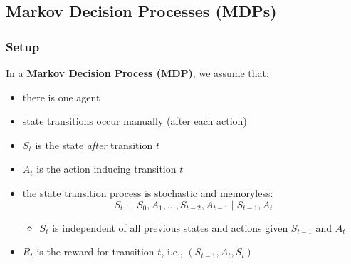 \subsection{Markov Decision Processes (MDPs)}
\subsubsection{Setup}
\begin{summary}
    In a \textbf{Markov Decision Process (MDP)}, we assume that:
    \begin{itemize}
        \item there is one agent
        \item state transitions occur manually (after each action)
        \item $S_t$ is the state \textit{after} transition $t$
        \item $A_t$ is the action inducing transition $t$
        \item the state transition process is stochastic and memoryless:
        \[
        S_t \perp S_0, A_1, \dots, S_{t-2}, A_{t-1} \mid S_{t-1}, A_t
        \]
        \begin{itemize}
            \item $S_t$ is independent of all previous states and actions given $S_{t-1}$ and $A_t$
        \end{itemize}
        \item $R_t$ is the reward for transition $t$, i.e., $(S_{t-1}, A_t, S_t)$
    \end{itemize}
\end{summary}
\newpage

